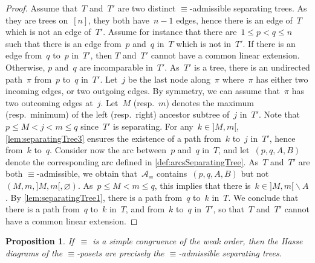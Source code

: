 \documentclass{amsart}
\newtheorem{proposition}[theorem]{Proposition}
\theoremstyle{definition}
\newcommand{\ssm}{\smallsetminus} %
\newcommand{\arcs}{{\mathcal{A}}} %
\begin{document}
\begin{proof}
Assume that~$T$ and~$T'$ are two distinct $\equiv$-admissible separating trees. 
As they are trees on~$[n]$, they both have~$n-1$ edges, hence there is an edge of~$T$ which is not an edge of~$T'$.
Assume for instance that there are~$1 \le p < q \le n$ such that there is an edge from~$p$ and~$q$ in~$T$ which is not in~$T'$.
If there is an edge from~$q$ to~$p$ in~$T'$, then $T$ and~$T'$ cannot have a common linear extension.
Otherwise, $p$ and~$q$ are incomparable in~$T'$.
As~$T'$ is a tree, there is an undirected path~$\pi$ from~$p$ to~$q$ in~$T'$.
Let~$j$ be the last node along~$\pi$ where~$\pi$ has either two incoming edges, or two outgoing edges.
By symmetry, we can assume that~$\pi$ has two outcoming edges at~$j$.
Let~$M$ (resp.~$m$) denotes the maximum (resp.~minimum) of the left (resp.~right) ancestor subtree of~$j$ in~$T'$.
Note that~$p \le M < j < m \le q$ since~$T'$ is separating.
For any~$k \in {]M,m[}$, \cref{lem:separatingTree3} ensures the existence of a path from~$k$ to~$j$ in~$T'$, hence from~$k$ to~$q$.
Consider now the arc between~$p$ and~$q$ in~$T$, and let~$(p, q, A, B)$ denote the corresponding arc defined in \cref{def:arcsSeparatingTree}.
As~$T$ and~$T'$ are both $\equiv$-admissible, we obtain that~$\arcs_\equiv$ contains~$(p, q, A, B)$ but not~$(M, m, {]M,m[}, \varnothing)$.
As~$p \le M < m \le q$, this implies that there is~$k \in {]M,m[} \ssm A$.
By \cref{lem:separatingTree1}, there is a path from~$q$ to~$k$ in~$T$.
We conclude that there is a path from~$q$ to~$k$ in~$T$, and from~$k$ to~$q$ in~$T'$, so that~$T$ and~$T'$ cannot have a common linear extension.
\end{proof}

\begin{proposition}
\label{prop:admissibleSeparatingTrees}
If~$\equiv$ is a simple congruence of the weak order, then the Hasse diagrams of the $\equiv$-posets are precisely the $\equiv$-admissible separating trees.
\end{proposition}
\end{document}
